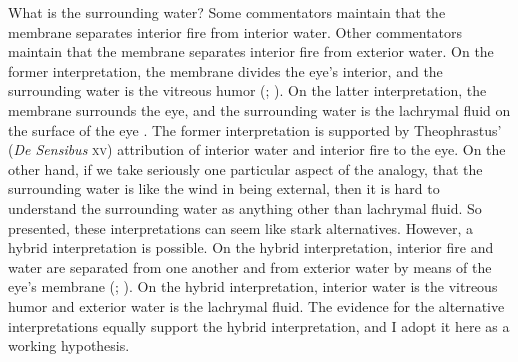 What is the surrounding water? Some commentators maintain that the membrane separates interior fire from interior water. Other commentators maintain that the membrane separates interior fire from exterior water. On the former interpretation, the membrane divides the eye's interior, and the surrounding water is the vitreous humor (\citealt[16]{Beare:1906uq}; \citealt[241--242]{Wright:1981zr}). On the latter interpretation, the membrane surrounds the eye, and the surrounding water is the lachrymal fluid on the surface of the eye \citep{Sedley:1992uq}. The former interpretation is supported by Theophrastus' (\emph{De Sensibus} \textsc{xv}) attribution of interior water and interior fire to the eye. On the other hand, if we take seriously one particular aspect of the analogy, that the surrounding water is like the wind in being external, then it is hard to understand the surrounding water as anything other than lachrymal fluid. So presented, these interpretations can seem like stark alternatives. However, a hybrid interpretation is possible. On the hybrid interpretation, interior fire and water are separated from one another and from exterior water by means of the eye's membrane (\citealt[326]{Lloyd:1966ly}; \citealt[26 n39]{Ierodiakonou:2005fk}). On the hybrid interpretation, interior water is the vitreous humor and exterior water is the lachrymal fluid. The evidence for the alternative interpretations equally support the hybrid interpretation, and I adopt it here as a working hypothesis.

